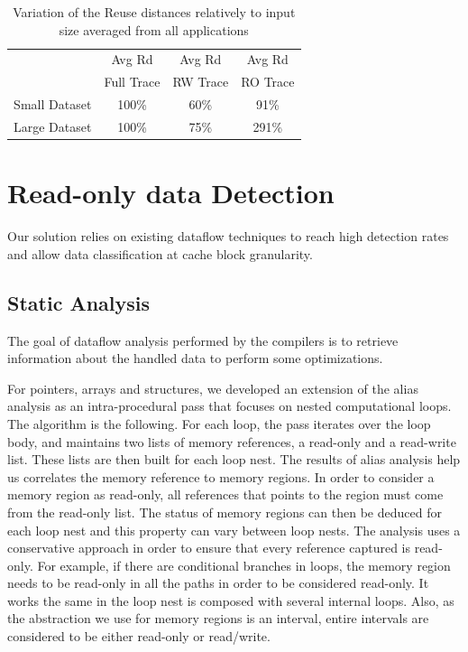 \documentclass[sigconf]{acmart}
\begin{document}
\begin{table}
\caption{Variation of the Reuse distances relatively to input size averaged from all applications}
\label{inputdata}
\begin{tabular}{ |c|c|c|c| }
\hline
 & Avg Rd& Avg Rd & Avg Rd \\
 & Full Trace& RW Trace & RO Trace\\
\hline
Small Dataset & 100\% & 60\% & 91\%\\
\hline
Large Dataset&  100\% & 75\%& 291\%\\
\hline
\end{tabular}
\end{table}


\section{Read-only data Detection}

 Our solution relies on existing dataflow techniques to reach high detection rates and allow data classification at cache block granularity. 

\subsection{Static Analysis}

The goal of dataflow analysis performed by the compilers is to retrieve information about the handled data to perform some optimizations.

For pointers, arrays and structures, we developed an extension of the alias analysis as an intra-procedural pass that focuses on nested computational loops. The algorithm is the following. For each loop, the pass iterates over the loop body, and maintains two lists of memory references, a read-only and a read-write list. These lists are then built for each loop nest. The results of alias analysis help us correlates the memory reference to memory regions. In order to consider a memory region as read-only, all references that points to the region must come from the read-only list. The status of memory regions can then be deduced for each loop nest and this property can vary between loop nests. The analysis uses a conservative approach in order to ensure that every reference captured is read-only. For example, if there are conditional branches in loops, the memory region needs to be read-only in all the paths in order to be considered read-only. It works the same in the loop nest is composed with several internal loops. Also, as the abstraction we use for memory regions is an interval, entire intervals are considered to be either read-only or read/write. 
\end{document}
